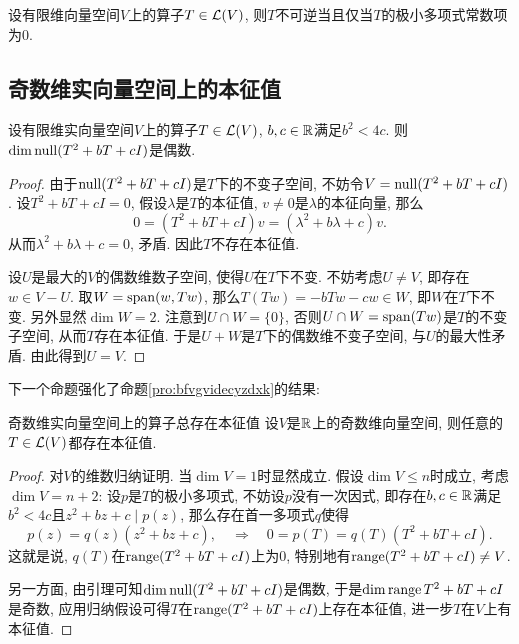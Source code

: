 \begin{proposition}{}
	设有限维向量空间$V$上的算子$T \in \mathcal{L} (V)$, 则$T$不可逆当且仅当$T$的极小多项式常数项为$0$. 
\end{proposition}

\subsection{奇数维实向量空间上的本征值}

\begin{lemma}{}
	设有限维实向量空间$V$上的算子$T \in \mathcal{L} (V)$, $b,c \in \mathbb{R}$满足$b^2<4c$. 则$\dim \operatorname{null} (T^2+bT+cI)$是偶数. 
\end{lemma}
\begin{proof}
	由于$\operatorname{null} (T^2+bT+cI)$是$T$下的不变子空间, 不妨令$V=\operatorname{null} (T^2+bT+cI)$. 设$T^2+bT+cI=0$, 假设$\lambda$是$T$的本征值, $v \neq 0$是$\lambda$的本征向量, 那么$$0 = (T^2+bT+cI)v=(\lambda ^2+b\lambda +c)v.$$
	从而$\lambda ^2+b\lambda +c=0$, 矛盾. 因此$T$不存在本征值. 
	
	设$U$是最大的$V$的偶数维数子空间, 使得$U$在$T$下不变. 不妨考虑$U \neq V$, 即存在$w \in V-U$. 取$W=\operatorname{span} (w,Tw)$, 那么$T(Tw)=-bTw-cw \in W$, 即$W$在$T$下不变. 另外显然$\dim W = 2$. 注意到$U \cap W=\{ 0 \}$, 否则$U \cap W = \operatorname{span} (Tw)$是$T$的不变子空间, 从而$T$存在本征值. 于是$U+W$是$T$下的偶数维不变子空间, 与$U$的最大性矛盾. 由此得到$U=V$. 
\end{proof}

下一个命题强化了命题\ref{pro:bfvgvidecyzdxk}的结果: 

\begin{proposition}{奇数维实向量空间上的算子总存在本征值}
	设$V$是$\mathbb{R}$上的奇数维向量空间, 则任意的$T \in \mathcal{L} (V)$都存在本征值. 
\end{proposition}
\begin{proof}
	对$V$的维数归纳证明. 当$\dim V=1$时显然成立. 假设$\dim V\leq n$时成立, 考虑$\dim V=n+2$: 设$p$是$T$的极小多项式, 不妨设$p$没有一次因式, 即存在$b,c \in \mathbb{R}$满足$b^2<4c$且$z^2+bz+c \mid p(z)$, 那么存在首一多项式$q$使得$$p(z)=q(z)(z^2+bz+c),\quad \Rightarrow \quad 0=p(T)=q(T)(T^2+bT+cI).$$
	这就是说, $q(T)$在$\operatorname{range} (T^2+bT+cI)$上为$0$, 特别地有$\operatorname{range} (T^2+bT+cI) \neq V$. 
	
	另一方面, 由引理可知$\dim \operatorname{null} (T^2+bT+cI)$是偶数, 于是$\dim \operatorname{range} T^2+bT+cI$是奇数, 应用归纳假设可得$T$在$\operatorname{range} (T^2+bT+cI)$上存在本征值, 进一步$T$在$V$上有本征值. 
\end{proof}


























